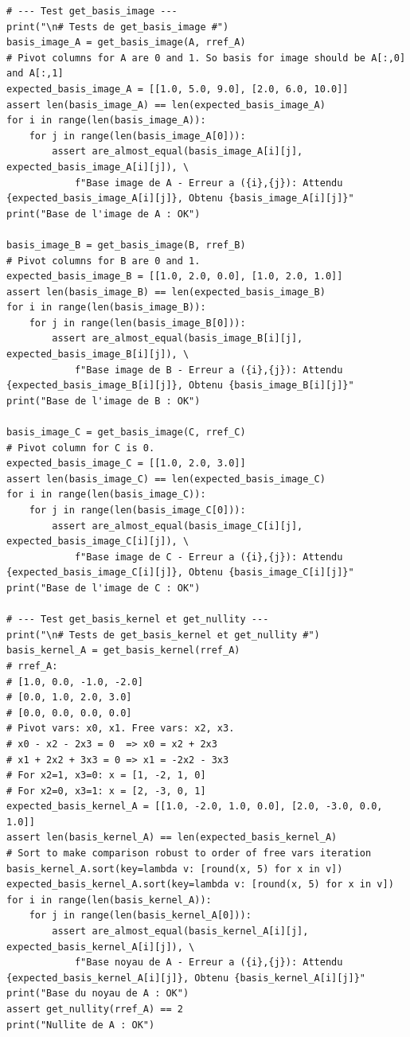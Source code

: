 \documentclass{report}
\begin{document}
\begin{verbatim}
# --- Test get_basis_image ---
print("\n# Tests de get_basis_image #")
basis_image_A = get_basis_image(A, rref_A)
# Pivot columns for A are 0 and 1. So basis for image should be A[:,0] and A[:,1]
expected_basis_image_A = [[1.0, 5.0, 9.0], [2.0, 6.0, 10.0]]
assert len(basis_image_A) == len(expected_basis_image_A)
for i in range(len(basis_image_A)):
    for j in range(len(basis_image_A[0])):
        assert are_almost_equal(basis_image_A[i][j], expected_basis_image_A[i][j]), \
            f"Base image de A - Erreur a ({i},{j}): Attendu {expected_basis_image_A[i][j]}, Obtenu {basis_image_A[i][j]}"
print("Base de l'image de A : OK")

basis_image_B = get_basis_image(B, rref_B)
# Pivot columns for B are 0 and 1.
expected_basis_image_B = [[1.0, 2.0, 0.0], [1.0, 2.0, 1.0]]
assert len(basis_image_B) == len(expected_basis_image_B)
for i in range(len(basis_image_B)):
    for j in range(len(basis_image_B[0])):
        assert are_almost_equal(basis_image_B[i][j], expected_basis_image_B[i][j]), \
            f"Base image de B - Erreur a ({i},{j}): Attendu {expected_basis_image_B[i][j]}, Obtenu {basis_image_B[i][j]}"
print("Base de l'image de B : OK")

basis_image_C = get_basis_image(C, rref_C)
# Pivot column for C is 0.
expected_basis_image_C = [[1.0, 2.0, 3.0]]
assert len(basis_image_C) == len(expected_basis_image_C)
for i in range(len(basis_image_C)):
    for j in range(len(basis_image_C[0])):
        assert are_almost_equal(basis_image_C[i][j], expected_basis_image_C[i][j]), \
            f"Base image de C - Erreur a ({i},{j}): Attendu {expected_basis_image_C[i][j]}, Obtenu {basis_image_C[i][j]}"
print("Base de l'image de C : OK")

# --- Test get_basis_kernel et get_nullity ---
print("\n# Tests de get_basis_kernel et get_nullity #")
basis_kernel_A = get_basis_kernel(rref_A)
# rref_A:
# [1.0, 0.0, -1.0, -2.0]
# [0.0, 1.0, 2.0, 3.0]
# [0.0, 0.0, 0.0, 0.0]
# Pivot vars: x0, x1. Free vars: x2, x3.
# x0 - x2 - 2x3 = 0  => x0 = x2 + 2x3
# x1 + 2x2 + 3x3 = 0 => x1 = -2x2 - 3x3
# For x2=1, x3=0: x = [1, -2, 1, 0]
# For x2=0, x3=1: x = [2, -3, 0, 1]
expected_basis_kernel_A = [[1.0, -2.0, 1.0, 0.0], [2.0, -3.0, 0.0, 1.0]]
assert len(basis_kernel_A) == len(expected_basis_kernel_A)
# Sort to make comparison robust to order of free vars iteration
basis_kernel_A.sort(key=lambda v: [round(x, 5) for x in v])
expected_basis_kernel_A.sort(key=lambda v: [round(x, 5) for x in v])
for i in range(len(basis_kernel_A)):
    for j in range(len(basis_kernel_A[0])):
        assert are_almost_equal(basis_kernel_A[i][j], expected_basis_kernel_A[i][j]), \
            f"Base noyau de A - Erreur a ({i},{j}): Attendu {expected_basis_kernel_A[i][j]}, Obtenu {basis_kernel_A[i][j]}"
print("Base du noyau de A : OK")
assert get_nullity(rref_A) == 2
print("Nullite de A : OK")


\end{verbatim}
\end{document}
